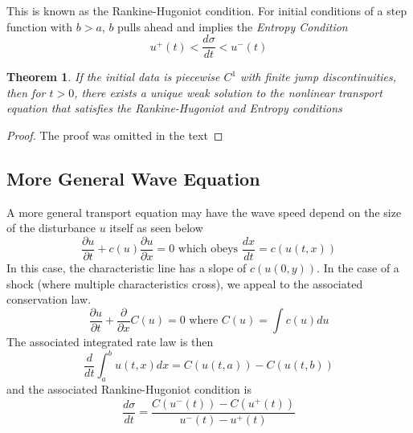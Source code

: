 \documentclass{article}
\newcommand{\pd}[2]{\frac{\partial #1}{\partial #2}}
\newcommand{\od}[2]{\frac{d #1}{d #2}}
\newtheorem{theorem}{Theorem}[section]
\numberwithin{equation}{section}
\begin{document}
This is known as the Rankine-Hugoniot condition. For initial conditions of a step function with $b>a$, $b$ pulls ahead and implies the \textit{Entropy Condition} 
\begin{equation*}
    u^+(t)<\od{\sigma}{t}<u^-(t)
\end{equation*}
\begin{theorem}
    If the initial data is piecewise $C^1$ with finite jump discontinuities, then for $t>0$, there exists a unique weak solution to the nonlinear transport equation that satisfies the Rankine-Hugoniot and Entropy conditions
\end{theorem}
\begin{proof}
    The proof was omitted in the text
\end{proof}



\subsection{More General Wave Equation}

A more general transport equation may have the wave speed depend on the size of the disturbance $u$ itself as seen below
\begin{equation*}
    \pd{u}{t}+c(u)\pd{u}{x} = 0 \text{ which obeys } \od{x}{t} = c(u(t,x))
\end{equation*}
In this case, the characteristic line has a slope of $c(u(0,y))$. In the case of a shock (where multiple characteristics cross), we appeal to the associated conservation law.
\begin{equation*}
    \pd{u}{t} + \frac{\partial}{\partial x}C(u) = 0 \text{ where } C(u) = \int c(u)du
\end{equation*}
The associated integrated rate law is then 
\begin{equation*}
    \frac{d}{dt}\int^b_au(t,x)dx = C(u(t,a))-C(u(t,b))
\end{equation*}
and the associated Rankine-Hugoniot condition is 
\begin{equation*}
    \od{\sigma}{t} = \frac{C(u^-(t)) - C(u^+(t))}{u^-(t)-u^+(t)}
\end{equation*}
\end{document}
